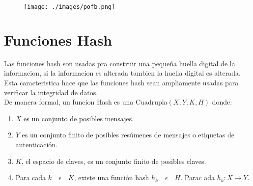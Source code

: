 \begin{figure}[H]
\centering
	\texttt{[image: ./images/pofb.png]}
	
\end{figure}
\pagebreak
\section{Funciones Hash}
Las funciones hash son usadas pra construir una pequeña huella digital de la informacion, si la informacion es alterada tambien la huella digital es alterada. Esta caracteristica hace que las funciones hash sean ampliamente usadas para verificar la integridad de datos.\\
De manera formal, un funcion Hash es una Cuadrupla$(X,Y,K,H)$ donde:
\begin{enumerate}
 \item $X$ es un conjunto de posibles mensajes.
 \item $Y$ es un conjunto finito de posibles resúmenes de mensajes o etiquetas de autenticación.
 \item $K$, el espacio de claves, es un conjunto finito de posibles claves.
 \item Para cada $k\quad \epsilon\quad K$, existe una función hash $h_k\quad \epsilon\quad H$. Parac ada $h_k: X \longrightarrow Y$.
 \cite{stinson}
\end{enumerate}



